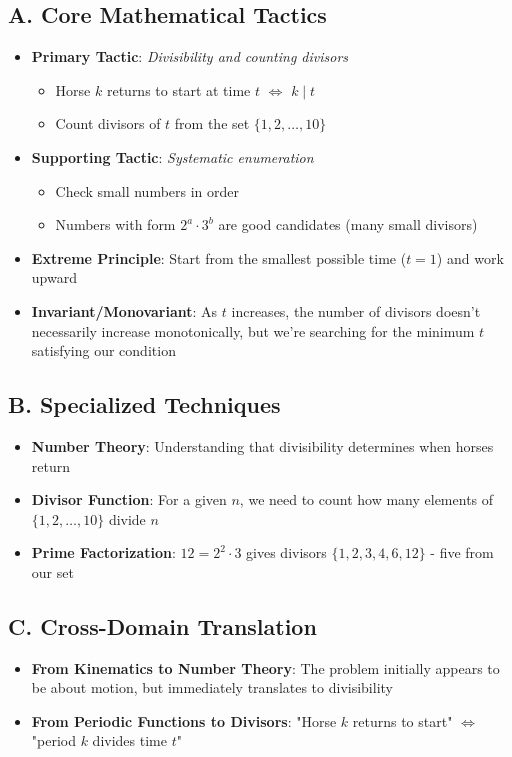 \documentclass[]{article}
\begin{document}
\begin{tacticalbox}
\subsection*{A. Core Mathematical Tactics}
\begin{itemize}[leftmargin=*]
    \item \textbf{Primary Tactic}: \textit{Divisibility and counting divisors}
    \begin{itemize}
        \item Horse $k$ returns to start at time $t$ $\Leftrightarrow$ $k \mid t$
        \item Count divisors of $t$ from the set $\{1,2,\ldots,10\}$
    \end{itemize}
    \item \textbf{Supporting Tactic}: \textit{Systematic enumeration}
    \begin{itemize}
        \item Check small numbers in order
        \item Numbers with form $2^a \cdot 3^b$ are good candidates (many small divisors)
    \end{itemize}
    \item \textbf{Extreme Principle}: Start from the smallest possible time ($t=1$) and work upward
    \item \textbf{Invariant/Monovariant}: As $t$ increases, the number of divisors doesn't necessarily increase monotonically, but we're searching for the minimum $t$ satisfying our condition
\end{itemize}

\subsection*{B. Specialized Techniques}
\begin{itemize}[leftmargin=*]
    \item \textbf{Number Theory}: Understanding that divisibility determines when horses return
    \item \textbf{Divisor Function}: For a given $n$, we need to count how many elements of $\{1,2,\ldots,10\}$ divide $n$
    \item \textbf{Prime Factorization}: $12 = 2^2 \cdot 3$ gives divisors $\{1, 2, 3, 4, 6, 12\}$ - five from our set
\end{itemize}

\subsection*{C. Cross-Domain Translation}
\begin{itemize}[leftmargin=*]
    \item \textbf{From Kinematics to Number Theory}: The problem initially appears to be about motion, but immediately translates to divisibility
    \item \textbf{From Periodic Functions to Divisors}: "Horse $k$ returns to start" $\Leftrightarrow$ "period $k$ divides time $t$"
\end{itemize}
\end{tacticalbox}
\end{document}
